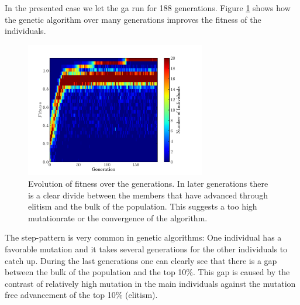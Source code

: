 In the presented case we let the \gls{ga} run for 188 generations. Figure \ref{fig:fitness_evolution} shows how the genetic algorithm over many generations improves the fitness of the \glspl{individual}. 

\begin{figure}[tb] %
   \centering
   \includegraphics[width=0.7\textwidth]{chapter_dalek/plots/plot_02bo_fit_evol.pdf} 
     \caption[Evolution of fitness over the generations]{Evolution of fitness over the generations. In later generations there is a clear divide between the members that have advanced through elitism and the bulk of the population. This suggests a too high mutationrate or the convergence of the algorithm. }
   \label{fig:fitness_evolution}
\end{figure}

The step-pattern is very common in genetic algorithms: One individual has a favorable mutation and it takes several generations for the other \glspl{individual} to catch up. During the last generations one can clearly see that there is a gap between the bulk of the population and the top 10\%. This gap is caused by the contrast of relatively high mutation in the main individuals against the mutation free advancement of the top 10\% (\gls{elitism}).


